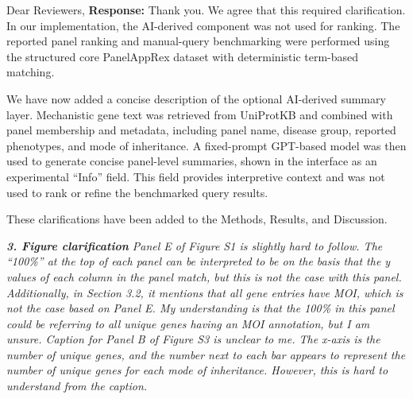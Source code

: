 \documentclass[12pt,a4paper]{letter}
\begin{document}
\begin{letter}{Dear Reviewers,}
\textbf{Response:} Thank you. We agree that this required clarification. In our implementation, the AI-derived component was not used for ranking. The reported panel ranking and manual-query benchmarking were performed using the structured core PanelAppRex dataset with deterministic term-based matching.

We have now added a concise description of the optional AI-derived summary layer. Mechanistic gene text was retrieved from UniProtKB and combined with panel membership and metadata, including panel name, disease group, reported phenotypes, and mode of inheritance. A fixed-prompt GPT-based model was then used to generate concise panel-level summaries, shown in the interface as an experimental ``Info'' field. This field provides interpretive context and was not used to rank or refine the benchmarked query results.

These clarifications have been added to the Methods, Results, and Discussion.

%
%

\textit{\textbf{3. Figure clarification}
Panel E of Figure S1 is slightly hard to follow. The “100\%” at the top of each panel can be interpreted to be on the basis that the y values of each column in the panel match, but this is not the case with this panel. Additionally, in Section 3.2, it mentions that all gene entries have MOI, which is not the case based on Panel E. My understanding is that the 100\% in this panel could be referring to all unique genes having an MOI annotation, but I am unsure.
Caption for Panel B of Figure S3 is unclear to me. The x-axis is the number of unique genes, and the number next to each bar appears to represent the number of unique genes for each mode of inheritance. However, this is hard to understand from the caption.}


\end{letter}
\end{document}
